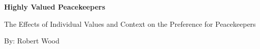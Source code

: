 \begin{titlepage}
	\begin{center}
		\vspace*{1cm}
		\huge %
		\textbf{Highly Valued Peacekeepers}
		
		\vspace{0.25cm}
		\LARGE
		The Effects of Individual Values and Context on the Preference for Peacekeepers

	\vspace{1cm}
	\Large
	By: Robert Wood

	\vspace{1cm}
	
	\vfill
	
	\end{center}
\end{titlepage}